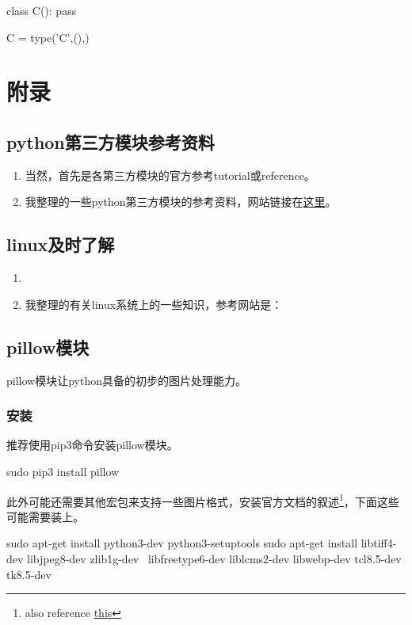 \documentclass[12pt,oneside]{book}
\begin{document}
\begin{common-format}
\begin{tcbpython}[]
class C():
    pass
\end{tcbpython}

\begin{tcbpython}[]
C = type('C',(),{})
\end{tcbpython}

\appendix
\part{附录}
\chapter{python第三方模块参考资料}
\begin{enumerate}
\item 当然，首先是各第三方模块的官方参考tutorial或reference。
\item 我整理的一些python第三方模块的参考资料，网站链接在\href{http://a358003542.github.io/articles/index.html#sec:python%E7%AC%AC%E4%B8%89%E6%96%B9%E6%A8%A1%E5%9D%97}{这里}。
\end{enumerate}


\chapter{linux及时了解}
\begin{enumerate}
\item 
\item 我整理的有关linux系统上的一些知识，参考网站是：
\end{enumerate}


\chapter{pillow模块}
pillow模块让python具备的初步的图片处理能力。

\section{安装}
推荐使用pip3命令安装pillow模块。

\begin{tcbbash}[]
sudo pip3 install pillow
\end{tcbbash}

此外可能还需要其他宏包来支持一些图片格式，安装官方文档的叙述\footnote{also reference \href{http://askubuntu.com/questions/427358/install-pillow-for-python-3}{this}}，下面这些可能需要装上。
\begin{tcbbash}[]
sudo apt-get install python3-dev python3-setuptools
sudo apt-get install libtiff4-dev libjpeg8-dev zlib1g-dev \
    libfreetype6-dev liblcms2-dev libwebp-dev tcl8.5-dev tk8.5-dev
\end{tcbbash}



\end{common-format}
\end{document}
